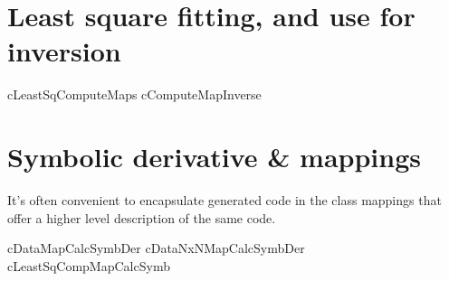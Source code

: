\section{Least square fitting, and use for inversion}
cLeastSqComputeMaps
cComputeMapInverse


\section{Symbolic derivative \& mappings}

It's often convenient to encapsulate generated code in the class
mappings that offer a higher level description of the same code. 

cDataMapCalcSymbDer
cDataNxNMapCalcSymbDer
cLeastSqCompMapCalcSymb




\label{CompMapInv}






